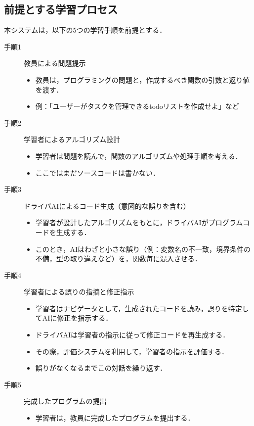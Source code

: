 \documentclass[twoside,twocolumn,10pt]{jsarticle}
\begin{document}
\subsection{前提とする学習プロセス}
本システムは，以下の5つの学習手順を前提とする．

\begin{description}
    \item[手順1] 教員による問題提示
        \begin{itemize}
            \item 教員は，プログラミングの問題と，作成するべき関数の引数と返り値を渡す．
            \item 例：「ユーザーがタスクを管理できるtodoリストを作成せよ」など
        \end{itemize}
    \item[手順2] 学習者によるアルゴリズム設計
        \begin{itemize}
            \item 学習者は問題を読んで，関数のアルゴリズムや処理手順を考える．
            \item ここではまだソースコードは書かない．
        \end{itemize}
    \item[手順3] ドライバAIによるコード生成（意図的な誤りを含む）
        \begin{itemize}
            \item 学習者が設計したアルゴリズムをもとに，ドライバAIがプログラムコードを生成する．
            \item このとき，AIはわざと小さな誤り（例：変数名の不一致，境界条件の不備，型の取り違えなど）を，関数毎に混入させる．
        \end{itemize}
    \item[手順4] 学習者による誤りの指摘と修正指示
        \begin{itemize}
            \item 学習者はナビゲータとして，生成されたコードを読み，誤りを特定してAIに修正を指示する．
            \item ドライバAIは学習者の指示に従って修正コードを再生成する．
            \item その際，評価システムを利用して，学習者の指示を評価する．
            \item 誤りがなくなるまでこの対話を繰り返す．
        \end{itemize}
    \item[手順5] 完成したプログラムの提出
        \begin{itemize}
            \item 学習者は，教員に完成したプログラムを提出する．
        \end{itemize}
\end{description}
\end{document}
